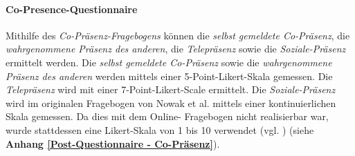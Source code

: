 \documentclass[a4paper,11pt]{article}%
\renewcommand{\\}{\vspace*{0.5\baselineskip} \newline}
\begin{document}
		\paragraph{Co-Presence-Questionnaire}
Mithilfe des \textit{Co-Präsenz-Fragebogens} können die \textit{selbst gemeldete Co-Präsenz}, die \textit{wahrgenommene Präsenz des anderen}, die \textit{Telepräsenz} sowie die \textit{Soziale-Präsenz} ermittelt werden. Die \textit{selbst gemeldete Co-Präsenz} sowie die \textit{wahrgenommene Präsenz des anderen} werden mittels einer 5-Point-Likert-Skala gemessen. Die \textit{Telepräsenz} wird mit einer 7-Point-Likert-Scale ermittelt. Die \textit{Soziale-Präsenz} wird im originalen Fragebogen von Nowak et al. mittels einer kontinuierlichen Skala gemessen. Da dies mit dem Online-
Fragebogen nicht realisierbar war, wurde stattdessen eine Likert-Skala von 1 bis 10 verwendet (vgl. \citep[S.487]{nowak2003effect}) (siehe \textbf{Anhang \ref{Post-Questionnaire - Co-Präsenz}}).
\clearpage
\newpage
\end{document}
